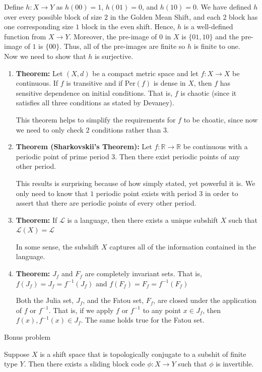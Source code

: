 \documentclass[12pt]{article}
\newenvironment{problem}[2][Problem]{\begin{trivlist}
\item[\hskip \labelsep {\bfseries #1}\hskip \labelsep {\bfseries #2.}]}{\end{trivlist}}
\begin{document}
\begin{problem}{2}
\end{problem}

Define $h: X \to Y$ as $h(00) = 1$, $h(01) = 0$, and $h(10) = 0$. We have defined $h$ over every possible block of size $2$ in the Golden Mean Shift, and each $2$ block has one corresponding size $1$ block in the even shift. Hence, $h$ is a well-defined function from $X \to Y$. Moreover, the pre-image of $0$ in $X$ is $\{01, 10\}$ and the pre-image of $1$ is $\{00\}$. Thus, all of the pre-images are finite so $h$ is finite to one.\\

Now we need to show that $h$ is surjective.

\begin{problem}{3}
\end{problem}

\begin{enumerate}

\item \textbf{Theorem:} Let $(X, d)$ be a compact metric space and let $f: X \to X$ be continuous. If $f$ is transitive and if Per$(f)$ is dense in $X$, then $f$ has sensitive dependence on initial conditions. That is, $f$ is chaotic (since it satisfies all three conditions as stated by Devaney).

This theorem helps to simplify the requirements for $f$ to be choatic, since now we need to only check $2$ conditions rather than $3$.

\item \textbf{Theorem (Sharkovskii's Theorem):} Let $f: \mathbb{R} \to \mathbb{R}$ be continuous with a periodic point of prime period $3$. Then there exist periodic points of any other period.

This results is surprising because of how simply stated, yet powerful it is. We only need to know that $1$ periodic point exists with period $3$ in order to assert that there are periodic points of every other period.

\item \textbf{Theorem:} If $\mathcal{L}$ is a language, then there exists a unique subshift $X$ such that $\mathcal{L}(X) = \mathcal{L}$

In some sense, the subshift $X$ captures all of the information contained in the language.

\item \textbf{Theorem:} $J_{f}$ and $F_{f}$ are completely invariant sets. That is, $f(J_{f}) = J_{f} = f^{-1}(J_{f})$ and $f(F_{f}) = F_{f} = f^{-1}(F_{f})$

Both the Julia set, $J_{f}$, and the Fatou set, $F_{f}$, are closed under the application of $f$ or $f^{-1}$. That is, if we apply $f$ or $f^{-1}$ to any point $x \in J_{f}$, then $f(x), f^{-1}(x) \in J_{f}$. The same holds true for the Fatou set.
\end{enumerate}

\begin{problem}{4}
Bonus problem
\end{problem}

Suppose $X$ is a shift space that is topologically conjugate to a subshit of finite type $Y$. Then there exists a sliding block code $\phi: X \to Y$ such that $\phi$ is invertible.
\end{document}

